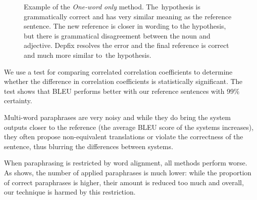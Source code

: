 \begin{figure}[t]
\begin{center}
\begin{tabular}{ll}
\end{tabular}
\caption{Example of the \textit{One-word only} method. 
The~hypothesis is grammatically correct and has very similar meaning as the reference sentence. 
The new reference is closer in wording to the hypothesis, but there is grammatical disagreement between the noun and adjective. 
Depfix resolves the error and the final reference is correct and much more similar to~the hypothesis.}
\label{example}
\end{center}
\end{figure}

We use a test for comparing correlated correlation coefficients 
\citep{meng1992comparing} to determine whether the difference in correlation
coefficients is statistically significant. The test shows that BLEU performs
better with our reference sentences with 99\% certainty. 

Multi-word paraphrases are very noisy and while they do bring the system 
outputs closer to the reference (the average BLEU score of the systems 
increases), they often propose non-equivalent translations or violate the 
correctness of the sentence, thus blurring the differences between systems.

When paraphrasing is restricted by word alignment, all methods perform worse. 
As  shows, the number of applied paraphrases is much
lower: while the proportion of correct paraphrases is higher, their amount is 
reduced too much and overall, our technique is harmed by this restriction. 

